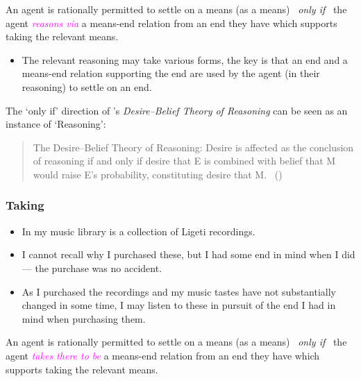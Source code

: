 \documentclass[10pt]{article}
\newenvironment{beamerblock}[1]{%
  \tcolorbox[standard,%
  no shadow,
  noparskip,
  colback=white,
  colframe=black,
  colbacktitle=white,
  coltitle=black,
  colupper=black,
  size=small,
  boxrule=.125mm,
  fonttitle=\bfseries,
  sharp corners=all,
  title=#1]}%
{\endtcolorbox}
\newcommand{\hozlinedash}[0]{%
  \noindent\hdashrule[0.5ex][c]{\textwidth}{.1pt}{2.5pt}
}
\begin{document}
\begin{beamerblock}{Reasoning}
  An agent is rationally permitted to settle on a means (as a means)
  \newline
  \mbox{ }\hfill\emph{only if}\hfill\mbox{ }
  \newline
  the agent \textcolor{fuchsia}{\emph{reasons via}} a means-end relation from an end they have which supports taking the relevant means.
\end{beamerblock}

\begin{itemize}
\item The relevant reasoning may take various forms, the key is that an end and a means-end relation supporting the end are used by the agent (in their reasoning) to settle on an end.
\end{itemize}




The `only if' direction of \citeauthor{Sinhababu:2017aa}'s \emph{Desire–Belief Theory of Reasoning} can be seen as an instance of `Reasoning':

\begin{quote}
  The Desire–Belief Theory of Reasoning: Desire is affected as the conclusion of reasoning if and only if desire that E is combined with belief that M would raise E’s probability, constituting desire that M.\nolinebreak
  \mbox{ }\hfill\mbox{(\citeyear[39]{Sinhababu:2017aa})}
\end{quote}



\hozlinedash

\subsubsection{Taking}
\label{sec:taking}

\begin{itemize}
\item In my music library is a collection of Ligeti recordings.
\item I cannot recall why I purchased these, but I had some end in mind when I did --- the purchase was no accident.
\item As I purchased the recordings and my music tastes have not substantially changed in some time, I may listen to these in pursuit of the end I had in mind when purchasing them.
\end{itemize}

\begin{beamerblock}{Taking}
  An agent is rationally permitted to settle on a means (as a means)
  \newline
  \mbox{ }\hfill\emph{only if}\hfill\mbox{ }
  \newline
  the agent \textcolor{fuchsia}{\emph{takes there to be}} a means-end relation from an end they have which supports taking the relevant means.
\end{beamerblock}
\end{document}
